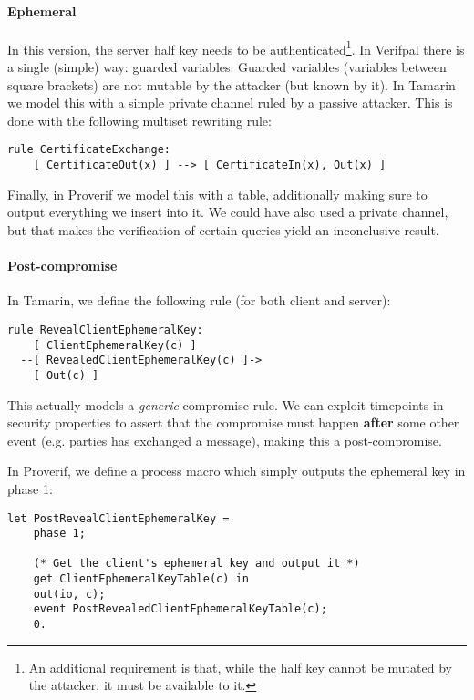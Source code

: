 \paragraph{Ephemeral} In this version, the server half key needs to be authenticated\footnote{An additional requirement is that, while the half key cannot be mutated by the attacker, it must be available to it.}. In Verifpal there is a single (simple) way: guarded variables. Guarded variables (variables between square brackets) are not mutable by the attacker (but known by it). In Tamarin we model this with a simple private channel ruled by a passive attacker. This is done with the following multiset rewriting rule:


\lstset{language=tamarin}
\begin{lstlisting}
rule CertificateExchange:
    [ CertificateOut(x) ] --> [ CertificateIn(x), Out(x) ]
\end{lstlisting}

Finally, in Proverif we model this with a table, additionally making sure to output everything we insert into it. We could have also used a private channel, but that makes the verification of certain queries yield an inconclusive result.

\paragraph{Post-compromise} In Tamarin, we define the following rule (for both client and server):

\lstset{language=tamarin}
\begin{lstlisting}
rule RevealClientEphemeralKey:
    [ ClientEphemeralKey(c) ]
  --[ RevealedClientEphemeralKey(c) ]->
    [ Out(c) ]
\end{lstlisting}

This actually models a \textit{generic} compromise rule. We can exploit timepoints in security properties to assert that the compromise must happen \textbf{after} some other event (e.g. parties has exchanged a message), making this a post-compromise.

In Proverif, we define a process macro which simply outputs the ephemeral key in phase 1:

\lstset{language=proverif}
\begin{lstlisting}
let PostRevealClientEphemeralKey =
    phase 1;

    (* Get the client's ephemeral key and output it *)
    get ClientEphemeralKeyTable(c) in
    out(io, c);
    event PostRevealedClientEphemeralKeyTable(c);
    0.
\end{lstlisting}

